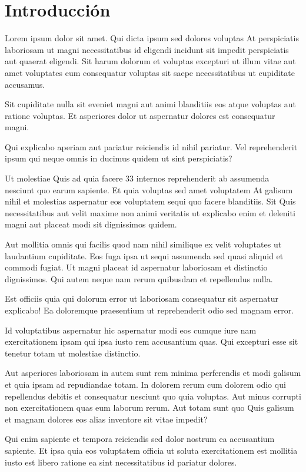 \chapter*{Introducción}

Lorem ipsum dolor sit amet. Qui dicta ipsum sed dolores voluptas At perspiciatis laboriosam ut magni necessitatibus id eligendi incidunt sit impedit perspiciatis aut quaerat eligendi. Sit harum dolorum et voluptas excepturi ut illum vitae aut amet voluptates eum consequatur voluptas sit saepe necessitatibus ut cupiditate accusamus.

Sit cupiditate nulla sit eveniet magni aut animi blanditiis eos atque voluptas aut ratione voluptas. Et asperiores dolor ut aspernatur dolores est consequatur magni.

Qui explicabo aperiam aut pariatur reiciendis id nihil pariatur. Vel reprehenderit ipsum qui neque omnis in ducimus quidem ut sint perspiciatis?

Ut molestiae Quis ad quia facere 33 internos reprehenderit ab assumenda nesciunt quo earum sapiente. Et quia voluptas sed amet voluptatem At galisum nihil et molestias aspernatur eos voluptatem sequi quo facere blanditiis. Sit Quis necessitatibus aut velit maxime non animi veritatis ut explicabo enim et deleniti magni aut placeat modi sit dignissimos quidem.

Aut mollitia omnis qui facilis quod nam nihil similique ex velit voluptates ut laudantium cupiditate. Eos fuga ipsa ut sequi assumenda sed quasi aliquid et commodi fugiat. Ut magni placeat id aspernatur laboriosam et distinctio dignissimos. Qui autem neque nam rerum quibusdam et repellendus nulla.

Est officiis quia qui dolorum error ut laboriosam consequatur sit aspernatur explicabo! Ea doloremque praesentium ut reprehenderit odio sed magnam error.

Id voluptatibus aspernatur hic aspernatur modi eos cumque iure nam exercitationem ipsam qui ipsa iusto rem accusantium quas. Qui excepturi esse sit tenetur totam ut molestiae distinctio.

Aut asperiores laboriosam in autem sunt rem minima perferendis et modi galisum et quia ipsam ad repudiandae totam. In dolorem rerum cum dolorem odio qui repellendus debitis et consequatur nesciunt quo quia voluptas. Aut minus corrupti non exercitationem quas eum laborum rerum. Aut totam sunt quo Quis galisum et magnam dolores eos alias inventore sit vitae impedit?

Qui enim sapiente et tempora reiciendis sed dolor nostrum ea accusantium sapiente. Et ipsa quia eos voluptatem officia ut soluta exercitationem est mollitia iusto est libero ratione ea sint necessitatibus id pariatur dolores.

